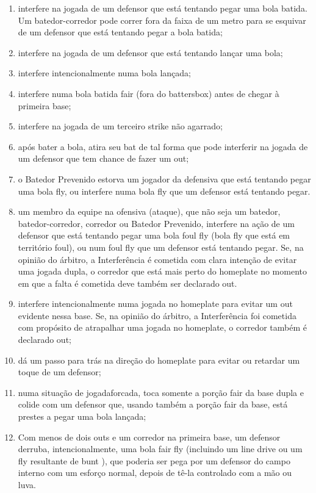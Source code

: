 \begin{enumerate}[label=(\alph*)]
\begin{enumerate}[label=\roman*.]
	\item  interfere na jogada de um defensor que está tentando pegar uma bola batida. Um batedor-corredor pode correr fora da faixa de um metro para se esquivar de um defensor que está tentando pegar a bola batida;
	\item  interfere na jogada de um defensor que está tentando lançar uma bola;
	\item  interfere intencionalmente numa bola lançada;
	\item  interfere numa bola batida \gls{fair} (fora do \gls{battersbox}) antes de chegar à primeira base;
	\item  interfere na jogada de um terceiro \gls{strike} não agarrado;
	\item  após bater a bola, atira seu \gls{bat} de tal forma que pode interferir na jogada de um defensor que tem chance de fazer um \gls{out};
	\item  o Batedor Prevenido estorva um jogador da defensiva que está tentando pegar uma bola \gls{fly}, ou interfere numa bola \gls{fly} que um defensor está tentando pegar.
	\item  um membro da equipe na ofensiva (ataque), que não seja um batedor, batedor-corredor, corredor ou Batedor Prevenido, interfere na ação de um defensor que está tentando pegar uma bola \gls{foul fly} (bola \gls{fly} que está em território \gls{foul}), ou num \gls{foul fly} que um defensor está tentando pegar. Se, na  opinião do árbitro, a Interferência é cometida com clara intenção de evitar uma  jogada dupla, o corredor que está mais perto do \gls{homeplate} no momento em que a falta é cometida deve também ser declarado \gls{out}.
	\item  interfere intencionalmente numa jogada no \gls{homeplate} para evitar um \gls{out} evidente nessa base. Se, na opinião do árbitro, a Interferência foi cometida com propósito de atrapalhar uma jogada no \gls{homeplate}, o corredor também é declarado \gls{out};
	\item   dá um passo para trás na direção do \gls{homeplate} para evitar ou retardar um toque de um defensor;
	\item  numa situação de \gls{jogadaforcada}, toca somente a porção \gls{fair} da base dupla e colide com um defensor que, usando também a porção \gls{fair} da base, está prestes a pegar uma bola lançada;
	\item  Com menos de dois \glspl{out} e um corredor na primeira base, um defensor derruba, intencionalmente, uma bola \gls{fair fly} (incluindo um \gls{line drive} ou um \gls{fly} resultante de \gls{bunt} ), que poderia ser pega por um defensor do campo interno com um esforço normal, depois de tê-la controlado com a mão ou luva.

\end{enumerate}
\end{enumerate}
